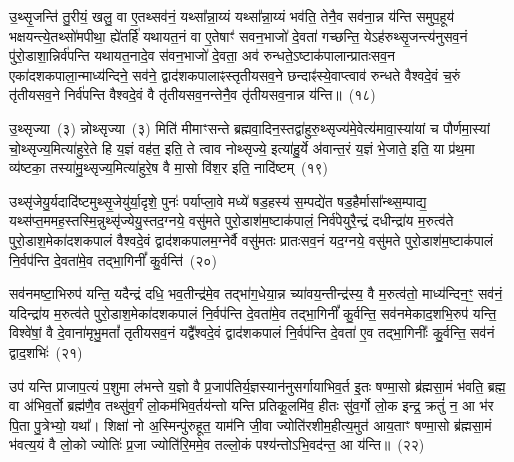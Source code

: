 {%
उ॒थ्सृ॒जन्ति॑ तु॒रीयं॒ खलु॒ वा ए॒तथ्सव॑नं॒ यथ्सा᳚न्ना॒य्यं यथ्सा᳚न्ना॒य्यं भव॑ति॒ तेनै॒व सव॑ना॒न्न य॑न्ति समुप॒हूय॑ भक्षयन्त्ये॒तथ्सो॑मपीथा॒ ह्ये॑तर्\mbox{}हि॑ यथायत॒नं वा ए॒तेषाꣳ॑ सवन॒भाजो॑ दे॒वता॑ गच्छन्ति॒ ये\-ऽह॑रुथ्सृ॒जन्त्य॑नुसव॒नं पु॑रो॒डाशा॒न्निर्व॑पन्ति यथायत॒नादे॒व स॑वन॒भाजो॑ दे॒वता॒ अव॑ रुन्धते॒\-ऽष्टाक॑पालान्प्रातःसव॒न एका॑\-दश\-कपाला॒\-न्माध्य॑न्दिने॒ सव॑ने॒ द्वाद॑श\-कपालाꣴस्तृतीयसव॒ने छन्दाꣴ॑स्ये॒वाप्त्वाव॑ रुन्धते वैश्वदे॒वं च॒रुं तृ॑तीयसव॒ने निर्व॑पन्ति वैश्वदे॒वं वै तृ॑तीयसव॒नन्तेनै॒व तृ॑तीयसव॒नान्न य॑न्ति॥~(१८)

{\anuvakamend[{उ॒दच॒त्युद्ये\-ऽह॑रा॒प्त्वा पञ्च॑दश च}]}%

उ॒थ्सृज्या~(३) न्नोथ्सृज्या~(३) मिति॑ मीमाꣳसन्ते ब्रह्मवा॒दिन॒स्तद्वा॑हुरु॒थ्सृज्य॑मे॒वेत्य॑मावा॒स्या॑यां च पौर्णमा॒स्यां चो॒थ्सृज्य॒मित्या॑हुरे॒ते हि य॒ज्ञं वह॑त॒ इति॒ ते त्वाव नोथ्सृज्ये॒ इत्या॑हु॒र्ये अ॑वान्त॒रं य॒ज्ञं भे॒जाते॒ इति॒ या प्र॑थ॒मा व्य॑ष्टका॒ तस्या॑मु॒थ्सृज्य॒मित्या॑हुरे॒ष वै मा॒सो वि॑श॒र इति॒ नादि॑ष्टम्~(१९)

उथ्सृ॑जेयु॒र्यदादि॑ष्टमुथ्सृ॒जेयु॑र्या॒दृशे॒ पुनः॑ पर्याप्ला॒वे मध्ये॑ षड॒हस्य॑ स॒म्पद्ये॑त षड॒हैर्मासा᳚न्थ्स॒म्पाद्य॒ यथ्स॑प्त॒ममह॒\-स्तस्मि॒न्नुथ्सृ॑ज्येयु॒स्तद॒ग्नये॒ वसु॑मते पुरो॒डाश॑\-म॒ष्टा\-क॑पालं॒ निर्व॑पेयुरै॒न्द्रं दधीन्द्रा॑य म॒रुत्व॑ते पुरो॒डाश॒मेका॑\-दश\-कपालं वैश्वदे॒वं द्वाद॑श\-कपालम॒ग्नेर्वै वसु॑मतः प्रातःसव॒नं यद॒ग्नये॒ वसु॑मते पुरो॒डाश॑\-म॒ष्टाक॑पालं नि॒र्वप॑न्ति दे॒वता॑मे॒व तद्भा॒गिनीं᳚ कु॒र्वन्ति॑~(२०)

सव॑नमष्टा॒भिरुप॑ यन्ति॒ यदैन्द्रं दधि॒ भव॒तीन्द्र॑मे॒व तद्भा॑ग॒धेया॒न्न च्या॑वय॒न्तीन्द्र॑स्य॒ वै म॒रुत्व॑तो॒ माध्य॑न्दिन॒ꣳ॒ सव॑नं॒ यदिन्द्रा॑य म॒रुत्व॑ते पुरो॒डाश॒मेका॑\-दश\-कपालं नि॒र्वप॑न्ति दे॒वता॑मे॒व तद्भा॒गिनीं᳚ कु॒र्वन्ति॒ सव॑नमेकाद॒शभि॒रुप॑ यन्ति॒ विश्वे॑षां॒ वै दे॒वाना॑मृभु॒मतां᳚ तृतीयसव॒नं यद्वै᳚श्वदे॒वं द्वाद॑श\-कपालं नि॒र्वप॑न्ति दे॒वता॑ ए॒व तद्भा॒गिनीः᳚ कु॒र्वन्ति॒ सव॑नं द्वाद॒शभिः॑~(२१)

उप॑ यन्ति प्राजाप॒त्यं प॒शुमा ल॑भन्ते य॒ज्ञो वै प्र॒जा\-प॑तिर्य॒ज्ञस्यान॑नुसर्गायाभिव॒र्त इ॒तः षण्मा॒सो ब्र॑ह्मसा॒मं भ॑वति॒ ब्रह्म॒ वा अ॑भिव॒र्तो ब्रह्म॑णै॒व तथ्सु॑व॒र्गं लो॒कम॑भिव॒र्तय॑न्तो यन्ति प्रतिकू॒लमि॑व॒ हीतः सु॑व॒र्गो लो॒क इन्द्र॒ क्रतुं॑ न॒ आ भ॑र पि॒ता पु॒त्रेभ्यो॒ यथा᳚। शिक्षा॑ नो अ॒स्मिन्पु॑रुहूत॒ याम॑नि जी॒वा ज्योति॑रशीम॒हीत्य॒मुत॑ आय॒ताꣳ षण्मा॒सो ब्र॑ह्मसा॒मं भ॑वत्य॒यं वै लो॒को ज्योतिः॑ प्र॒जा ज्योति॑रि॒ममे॒व तल्लो॒कं पश्य॑न्तो\-ऽभि॒वद॑न्त॒ आ य॑न्ति॥~(२२)

{\anuvakamend[{नादि॑ष्टङ्कु॒र्वन्ति॑ द्वाद॒शभि॒रिति॑ विꣳश॒तिश्च॑}]}%

}
